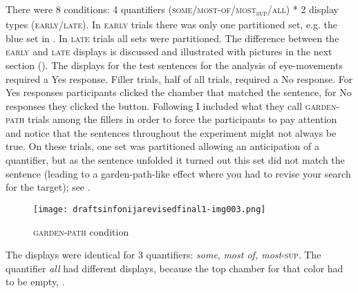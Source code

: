 \documentclass[output=paper]{langscibook}
\begin{document}
There were 8 conditions: 4 quantifiers (\textsc{some}/\textsc{most-of}/\textsc{most\textsubscript{sup}}\textsc{/all}) * 2 display types
(\textsc{early}/\textsc{late}). In \textsc{early} trials there was only one partitioned set, e.g. the blue set in . In \textsc{late} trials all sets
were partitioned. The difference between the \textsc{early} and \textsc{late} displays is discussed and illustrated with pictures in the
next section (). The displays for the test sentences for the analysis of eye-movements required a Yes response.
Filler trials, half of all trials, required a No response. For Yes responses participants clicked the chamber that
matched the sentence, for No responses they clicked the button. Following \citet{degen2011making,degen2016availability}  I included what they call \textsc{garden-path} trials among the fillers in order to force the participants to pay attention and notice
that the sentences throughout the experiment might not always be true. On these trials, one set was partitioned
allowing an anticipation of a quantifier, but as the sentence unfolded it turned out this set did not match the
sentence (leading to a garden-path-like effect where you had to revise your search for
the target); see .

\begin{figure}[h]
\texttt{[image: draftsinfonijarevisedfinal1-img003.png]}
\centering
    \caption{\textsc{garden-path} condition}
    \label{tom:fig:garden}
\end{figure}

The displays were identical for 3 quantifiers: \textit{some}, \textit{most of, most}\textsc{-sup}. The quantifier
\textit{all} had different displays, because the top chamber for that color had to be empty, .




\end{document}
